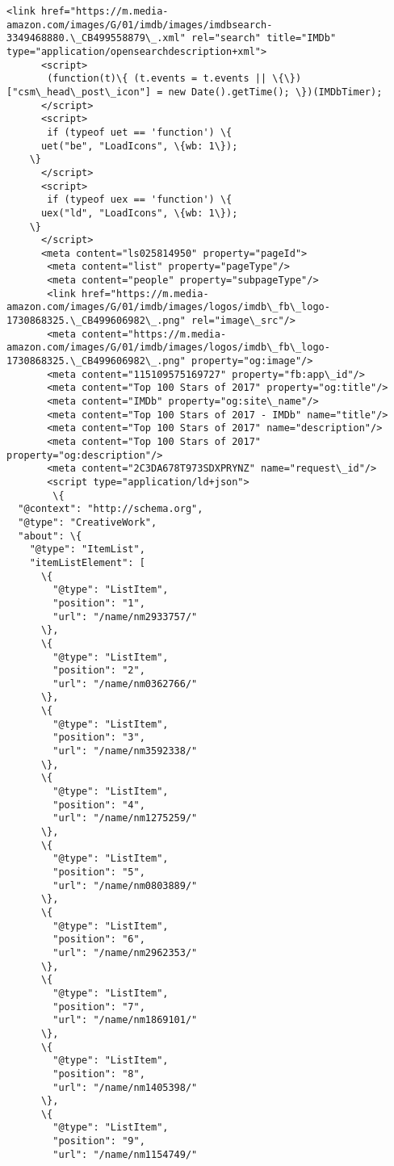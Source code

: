 \documentclass[11pt]{article}
\begin{document}
\begin{Verbatim}[commandchars=\\\{\}]
     <link href="https://m.media-amazon.com/images/G/01/imdb/images/imdbsearch-3349468880.\_CB499558879\_.xml" rel="search" title="IMDb" type="application/opensearchdescription+xml">
      <script>
       (function(t)\{ (t.events = t.events || \{\})["csm\_head\_post\_icon"] = new Date().getTime(); \})(IMDbTimer);
      </script>
      <script>
       if (typeof uet == 'function') \{
      uet("be", "LoadIcons", \{wb: 1\});
    \}
      </script>
      <script>
       if (typeof uex == 'function') \{
      uex("ld", "LoadIcons", \{wb: 1\});
    \}
      </script>
      <meta content="ls025814950" property="pageId">
       <meta content="list" property="pageType"/>
       <meta content="people" property="subpageType"/>
       <link href="https://m.media-amazon.com/images/G/01/imdb/images/logos/imdb\_fb\_logo-1730868325.\_CB499606982\_.png" rel="image\_src"/>
       <meta content="https://m.media-amazon.com/images/G/01/imdb/images/logos/imdb\_fb\_logo-1730868325.\_CB499606982\_.png" property="og:image"/>
       <meta content="115109575169727" property="fb:app\_id"/>
       <meta content="Top 100 Stars of 2017" property="og:title"/>
       <meta content="IMDb" property="og:site\_name"/>
       <meta content="Top 100 Stars of 2017 - IMDb" name="title"/>
       <meta content="Top 100 Stars of 2017" name="description"/>
       <meta content="Top 100 Stars of 2017" property="og:description"/>
       <meta content="2C3DA678T973SDXPRYNZ" name="request\_id"/>
       <script type="application/ld+json">
        \{
  "@context": "http://schema.org",
  "@type": "CreativeWork",
  "about": \{
    "@type": "ItemList",
    "itemListElement": [
      \{
        "@type": "ListItem",
        "position": "1",
        "url": "/name/nm2933757/"
      \},
      \{
        "@type": "ListItem",
        "position": "2",
        "url": "/name/nm0362766/"
      \},
      \{
        "@type": "ListItem",
        "position": "3",
        "url": "/name/nm3592338/"
      \},
      \{
        "@type": "ListItem",
        "position": "4",
        "url": "/name/nm1275259/"
      \},
      \{
        "@type": "ListItem",
        "position": "5",
        "url": "/name/nm0803889/"
      \},
      \{
        "@type": "ListItem",
        "position": "6",
        "url": "/name/nm2962353/"
      \},
      \{
        "@type": "ListItem",
        "position": "7",
        "url": "/name/nm1869101/"
      \},
      \{
        "@type": "ListItem",
        "position": "8",
        "url": "/name/nm1405398/"
      \},
      \{
        "@type": "ListItem",
        "position": "9",
        "url": "/name/nm1154749/"

\end{Verbatim}
\end{document}

